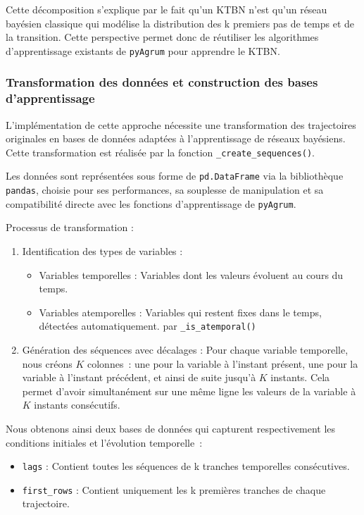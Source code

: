 \documentclass{article}
\begin{document}
Cette décomposition s'explique par le fait qu'un KTBN n'est qu'un réseau bayésien classique qui modélise la
distribution des k premiers pas de temps et de la transition. Cette perspective permet donc de réutiliser
les algorithmes d'apprentissage existants de \texttt{pyAgrum} pour apprendre le KTBN.

\subsubsection{Transformation des données et construction des bases d'apprentissage}

L'implémentation de cette approche nécessite une transformation des trajectoires originales en bases de données
adaptées à l'apprentissage de réseaux bayésiens. Cette transformation est réalisée par la fonction
\texttt{\_create\_sequences()}.

Les données sont représentées sous forme de \texttt{pd.DataFrame} via la bibliothèque \texttt{pandas}, choisie
pour ses performances, sa souplesse de manipulation et sa compatibilité directe avec les fonctions d'apprentissage
de \texttt{pyAgrum}.

Processus de transformation :

\begin{enumerate}
    \item Identification des types de variables :
          \begin{itemize}
              \item Variables temporelles : Variables dont les valeurs évoluent au cours du temps.
              \item Variables atemporelles : Variables qui restent fixes dans le temps, détectées automatiquement.
                    par \texttt{\_is\_atemporal()}
          \end{itemize}
    \item Génération des séquences avec décalages :
          Pour chaque variable temporelle, nous créons $K$ colonnes~: une pour la variable à l'instant présent,
          une pour la variable à l'instant précédent, et ainsi de suite jusqu'à $K$ instants. Cela permet d'avoir
          simultanément sur une même ligne les valeurs de la variable à $K$ instants consécutifs.
\end{enumerate}

Nous obtenons ainsi deux bases de données qui capturent respectivement les conditions initiales et l'évolution temporelle :

\begin{itemize}
    \item \texttt{lags} : Contient toutes les séquences de k tranches temporelles consécutives.
    \item \texttt{first\_rows} : Contient uniquement les k premières tranches de chaque trajectoire.
\end{itemize}
\end{document}
